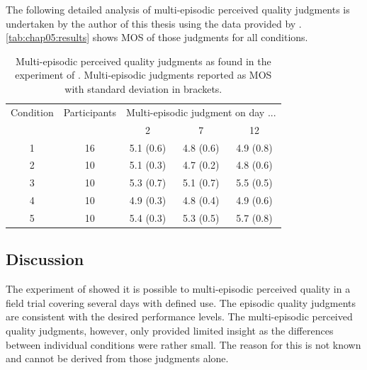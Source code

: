 The following detailed analysis of multi-episodic perceived quality judgments is undertaken by the author of this thesis using the data provided by \cite{moller_single-call_2011}.
\autoref{tab:chap05:results} shows \ac{MOS} of those judgments for all conditions.


\begin{table}[h]
	\centering
	\begin{tabular}{|c|c||c|c|c|}
	Condition 	& Participants 	& \multicolumn{3}{|c|}{Multi-episodic judgment on day ...} \\
				&				& 2	& 7 & 12 \\
	\hline
	1 			& 16 			& 5.1 (0.6) & 4.8 (0.6) & 4.9 (0.8) \\
	2 			& 10 			& 5.1 (0.3) & 4.7 (0.2) & 4.8 (0.6) \\
	3 			& 10 			& 5.3 (0.7) & 5.1 (0.7) & 5.5 (0.5) \\
	4 			& 10 			& 4.9 (0.3) & 4.8 (0.4) & 4.9 (0.6) \\
	5 			& 10 			& 5.4 (0.3) & 5.3 (0.5) & 5.7 (0.8) \\
	\hline
	\end{tabular}
	\caption{Multi-episodic perceived quality judgments as found in the experiment of \cite{moller_single-call_2011}. Multi-episodic judgments reported as \ac{MOS} with standard deviation in brackets.}
	\label{tab:chap05:results}
\end{table}

\subsection{Discussion}
The experiment of \cite{moller_single-call_2011} showed it is possible to multi-episodic perceived quality in a field trial covering several days with defined use.
The episodic quality judgments are consistent with the desired performance levels.
The multi-episodic perceived quality judgments, however, only provided limited insight as the differences between individual conditions were rather small.
The reason for this is not known and cannot be derived from those judgments alone.

